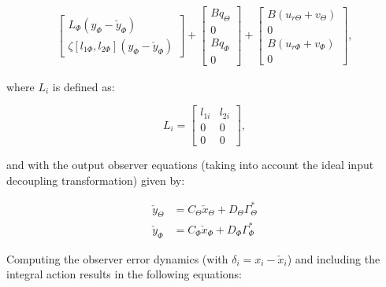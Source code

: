 \documentclass[main.tex]{subfiles}
\begin{document}
\begin{align}
\begin{bmatrix}
	L_{\Phi}(y_{\Phi} - \check{y}_{\Phi}) \\
	\zeta[l_{1\Phi},l_{2{\Phi}}](y_\Phi - \check{y}_\Phi)
	\end{bmatrix} +
	\begin{bmatrix}
		Bq_\Theta \\
		0 \\
		Bq_\Phi \\
		0	
	\end{bmatrix} +
	\begin{bmatrix}
	B(u_{r\Theta} + v_\Theta)\\
	0 \\
	B(u_{r\Phi} + v_\Phi) \\
	0
	\end{bmatrix},
	\end{align}
		
	where $L_i$ is defined as:
	
	\begin{equation}
		L_i = \begin{bmatrix}
		l_{1i} & l_{2i} \\
		0 & 0 \\
		0 & 0 
		\end{bmatrix},
	\end{equation}
	
	and with the output observer equations (taking into account the ideal input decoupling transformation) given by:
		
	\begin{align}
		\check{y}_\Theta &= C_\Theta \check{x}_\Theta + D_\Theta \Gamma_\Theta^* \\
		\check{y}_\Phi &= C_\Phi \check{x}_\Phi + D_\Phi \Gamma_\Phi^*		
	\end{align}
	
	Computing the observer error dynamics (with $\delta_i = x_i - \check{x}_i$) and including the integral action results in the following equations:
	
\end{document}
